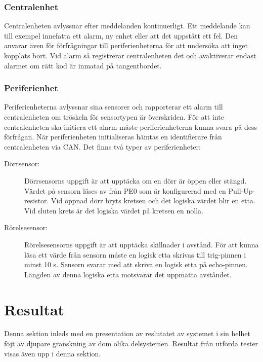 \documentclass[a4paper]{article}
\begin{document}
\subsubsection{Centralenhet}
Centralenheten avlyssnar efter meddelanden kontinuerligt.
Ett meddelande kan till exempel innefatta ett alarm, ny enhet eller att det uppstått ett fel.
Den anvarar även för förfrågningar till periferienheterna för att undersöka att inget kopplats bort.
Vid alarm så registrerar centralenheten det och avaktiverar endast alarmet om rätt kod är inmatad på tangentbordet.


\subsubsection{Periferienhet}
Periferienheterna avlyssnar sina sensorer och rapporterar ett alarm till centralenheten om tröskeln för sensortypen är överskriden.
För att inte centralenheten ska initiera ett alarm måste periferienheterna kunna svara på dess förfrågan.
När periferienheten initialiseras hämtas en identifierare från centralenheten via CAN. Det finns två typer av periferienheter:

\begin{description}
  \item[Dörrsensor:] Dörrsensorns uppgift är att upptäcka om en dörr är öppen eller stängd. Värdet på sensorn läses av från PE0 som är konfigurerad med en Pull-Up-resistor.
  Vid öppnad dörr bryts kretsen och det logiska värdet blir en etta. Vid sluten krets är det logiska värdet på kretsen en nolla.

  \item[Rörelsesensor:] Rörelsesensorns uppgift är att upptäcka skillnader i avstånd.
  För att kunna läsa ett värde från sensorn måste en logisk etta skrivas till trig-pinnen i minst 10 \textmu s.
  Sensorn svarar med att skriva en logisk etta på echo-pinnen.
  Längden av denna logiska etta motsvarar det uppmätta avståndet.
\end{description}

\section{Resultat}
Denna sektion inleds med en presentation av reslutatet av systemet i sin helhet föjt av djupare granskning av dom olika delsystemen. Resultat från utförda tester visas även upp i denna sektion.
\end{document}
